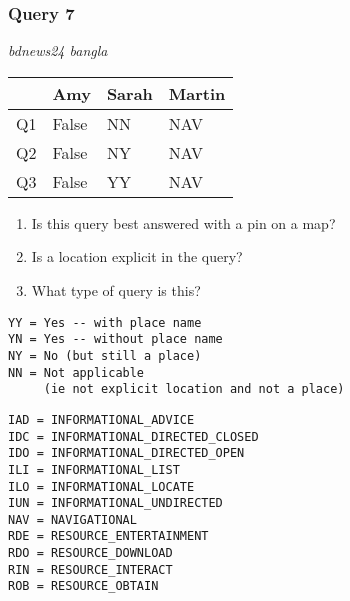 \begin{frame}[fragile]
\frametitle{Query 7}
\vspace{1em}

\emph{bdnews24 bangla}

\vfill

\begin{table}
  \centering
  \begin{tabular}{ l l l l }
    & \textbf{Amy} & \textbf{Sarah} & \textbf{Martin}\\
    \toprule
    Q1 & False & NN & NAV\\
Q2 & False & NY & NAV\\
Q3 & False & YY & NAV\\
    \bottomrule
  \end{tabular}
\end{table}

\vfill

\tiny{

\begin{enumerate}
\item Is this query best answered with a pin on a map?
\item Is a location explicit in the query?
\item What type of query is this?
\end{enumerate}

\vfill

\begin{multicols}{2}
\begin{verbatim}
YY = Yes -- with place name
YN = Yes -- without place name
NY = No (but still a place)
NN = Not applicable 
     (ie not explicit location and not a place)
\end{verbatim}

\columnbreak
\begin{verbatim}
IAD = INFORMATIONAL_ADVICE
IDC = INFORMATIONAL_DIRECTED_CLOSED
IDO = INFORMATIONAL_DIRECTED_OPEN
ILI = INFORMATIONAL_LIST
ILO = INFORMATIONAL_LOCATE
IUN = INFORMATIONAL_UNDIRECTED
NAV = NAVIGATIONAL
RDE = RESOURCE_ENTERTAINMENT
RDO = RESOURCE_DOWNLOAD
RIN = RESOURCE_INTERACT
ROB = RESOURCE_OBTAIN
\end{verbatim}
\end{multicols}
}

\end{frame}


